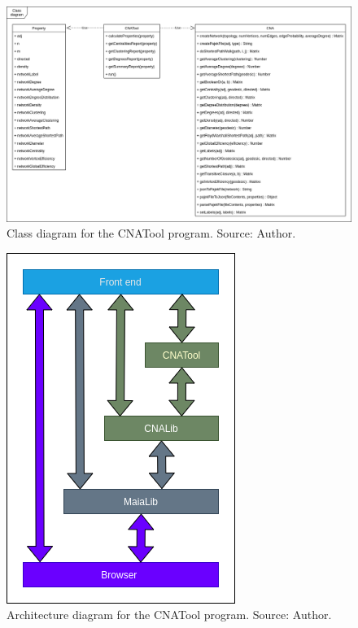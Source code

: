 \documentclass[preprint,12pt, a4paper]{elsarticle}
\begin{document}
\begin{figure}[!htbp]
    \begin{center}
        \includegraphics[scale=0.3]{images/class-diagram.png}
    \end{center}
    \caption{Class diagram for the CNATool program. Source: Author.}
    \label{fig:classdiagram}
\end{figure}

\begin{figure}[!htbp]
    \begin{center}
        \includegraphics[scale=0.5]{images/architecture.png}
    \end{center}
    \caption{Architecture diagram for the CNATool program. Source: Author.}
    \label{fig:architecture}
\end{figure}
\end{document}

